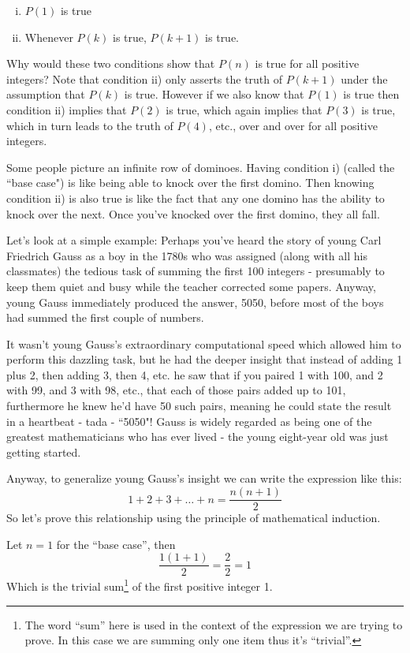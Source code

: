 \documentclass{article}
\begin{document}
\begin{enumerate}[i)]
\item $P(1)$ is true
\item Whenever $P(k)$ is true, $P(k+1)$ is true.
\end{enumerate}

Why would these two conditions show that $P(n)$ is true for all
positive integers? Note that condition ii) only asserts the truth
of $P(k+1)$ under the assumption that $P(k)$ is true.
However if we also know that $P(1)$ is true then condition ii) implies that $P(2)$ is true,
which again implies that $P(3)$ is true,
which in turn leads to the truth of $P(4)$,
etc., over and over for all positive integers.

Some people picture an infinite row of dominoes.
Having condition i) (called the ``base case") is like being
able to knock over the first domino.
Then knowing condition ii) is also true is like the
fact that any one domino has the ability to knock over the next.
Once you've knocked over the first domino,
they all fall.

Let's look at a simple example:
Perhaps you've heard the story of young Carl Friedrich Gauss
as a boy in
the 1780s who was assigned (along with all his classmates)
the tedious task of summing the first 100 integers -
presumably to keep them quiet and busy while the
teacher corrected some papers. Anyway,
young Gauss immediately produced the answer,
5050, before most of the boys had summed the first couple of numbers.

It wasn't young Gauss's extraordinary computational speed which allowed
him to perform this dazzling task,
but he had the deeper insight that instead of adding 1 plus 2,
then adding 3, then 4, etc.
he saw that if you paired 1 with 100,
and 2 with 99,
and 3 with 98,
etc.,
that each of those pairs added up to 101,
furthermore he knew he'd have 50 such pairs,
meaning he could state the result in a heartbeat - tada - ``5050"!
Gauss is widely regarded as being one of the greatest
mathematicians who has ever lived - the young eight-year old was just getting started.

\break
Anyway,
to generalize young Gauss's insight we can write the expression like this:
\[1+2+3+\ldots+n=\frac{n(n+1)}{2}\]
So let's prove this relationship using the principle of mathematical induction.
\bigskip

Let $n=1$ for the ``base case'',
then
\[\frac{1(1+1)}{2}=\frac{2}{2}=1\]
Which is the trivial sum\footnote{The word ``sum'' here is used in the context of the expression we are trying to prove. In this case we are summing only one item thus it's ``trivial''.} of the first positive integer 1.
\bigskip
\end{document}
